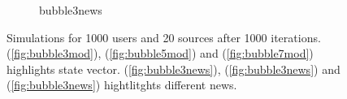 \begin{figure}
\begin{subfigure}[t]{0.35\textwidth}
    \label{fig:bubble5news}
    \caption{bubble3news}
  \end{subfigure}
  \caption{Simulations for 1000 users and 20 sources after 1000
    iterations. (\ref{fig:bubble3mod}), (\ref{fig:bubble5mod}) and
    (\ref{fig:bubble7mod}) highlights state vector.
    (\ref{fig:bubble3news}), (\ref{fig:bubble3news}) and
    (\ref{fig:bubble3news}) hightlitghts different news.
}
  \label{fig:test}
\end{figure}
